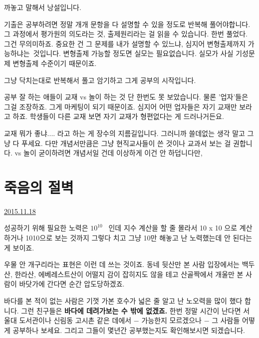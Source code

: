 까놓고 말해서 낭설입니다.
\vspace{5mm}

기출은 공부하려면 정말 개개 문항을 다 설명할 수 있을 정도로 반복해 풀어야합니다.
그 과정에서 평가원의 의도라는 것, 출제원리라는 걸 읽을 수 있습니다.
한번 풀었다. 그건 무의미하죠. 중요한 건 그 문제를 내가 설명할 수 있느냐, 심지어 변형출제까지 가능하냐는 것입니다.
변형출제 가능할 정도면 실모는 필요없습니다. 실모가 사실 기성문제 변형출제 수준이기 때문이죠.
\vspace{5mm}

그냥 닥치는대로 반복해서 풀고 암기하고 그게 공부의 시작입니다.
\vspace{5mm}

공부 잘 하는 애들이 교재 vs 놀이 하는 것 단 한번도 못 보았습니다.
물론 '업자'들은 그걸 조장하죠. 그게 마케팅이 되기 때문이죠.
심지어 어떤 업자들은 자기 교재만 보라고 하죠. 학생들이 다른 교재 보면 자기 교재가 형편없다는 게 드러나거든요.
\vspace{5mm}

교재 뭐가 좋냐.... 라고 하는 게 장수의 지름길입니다.
그러니까 쓸데없는 생각 말고 그냥 다 푸세요.
다만 개념서만큼은 그냥 현직교사들이 쓴 것이나 교과서 보는 걸 권합니다.
vs 놀이 굳이하려면 개념서일 건데 이상하게 이건 안 하덥니다만,
\vspace{5mm}








\section{죽음의 절벽}
\href{https://www.kockoc.com/Apoc/497307}{2015.11.18}

\vspace{5mm}

성공하기 위해 필요한 노력은 $10^10$  인데
지수 계산을 할 줄 몰라서 10 x 10 으로 계산하거나
1010으로 보는 것까지 그렇다 치고 그냥 10만 해놓고 난 노력했는데 안 된다는 게 보이죠.
\vspace{5mm}

우물 안 개구리라는 표현은 이런 데 쓰는 것이죠.
동네 뒷산만 본 사람 입장에서는 백두산, 한라산, 에베레스트산이 어떨지 감이 잡히지도 않을 테고
산골짝에서 개울만 본 사람이 바닷가에 간다면 순간 압도당하겠죠.
\vspace{5mm}

바다를 본 적이 없는 사람은 기껏 가본 호수가 넓은 줄 알고 난 노오력을 많이 했다 합니다.
그런 친구들은 \textbf{바다에 데려가보는 수 밖에 없겠죠.}
한번 정말 시간이 난다면 서울대 도서관이나 신림동 고시촌 같은 데에서 $-$ 가능한지 모르겠으나 $-$ 그 사람들 어떻게 공부하나 보세요.
그리고 그들이 몇년간 공부했는지도 확인해보시면 되겠습니다.
\vspace{5mm}


